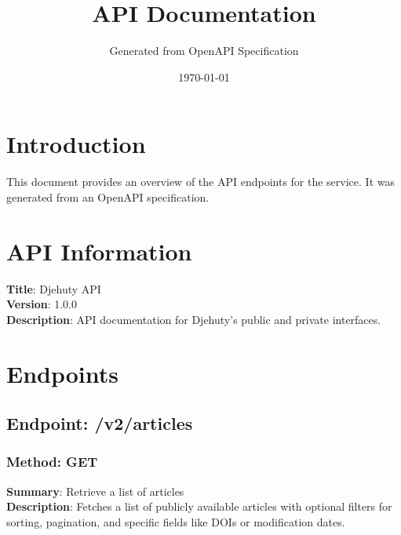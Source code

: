 \documentclass[a4paper]{article}
\title{API Documentation}
\author{Generated from OpenAPI Specification}
\date{\today}
\begin{document}
\maketitle
\section*{Introduction}
This document provides an overview of the API endpoints for the service.
It was generated from an OpenAPI specification.
\newpage
\section*{API Information}\n\textbf{Title}: Djehuty API\\
\textbf{Version}: 1.0.0\\
\textbf{Description}: API documentation for Djehuty's public and private interfaces.\\

\section*{Endpoints}\n\subsection*{Endpoint: /v2/articles}
\subsubsection*{Method: GET}
\textbf{Summary}: Retrieve a list of articles\\
\textbf{Description}: Fetches a list of publicly available articles with optional filters for sorting, pagination, and specific fields like DOIs or modification dates.
\\
\end{document}
